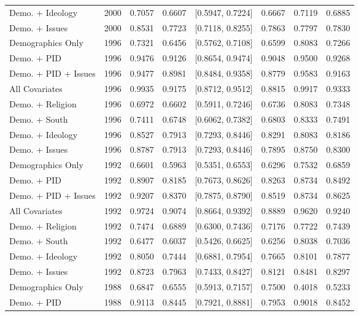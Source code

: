\begin{longtable}{lrrrlrrr}
  Demo. + Ideology & 2000 & 0.7057 & 0.6607 & [0.5947, 0.7224] & 0.6667 & 0.7119 & 0.6885 \\ 
  Demo. + Issues & 2000 & 0.8531 & 0.7723 & [0.7118, 0.8255] & 0.7863 & 0.7797 & 0.7830 \\ 
  Demographics Only & 1996 & 0.7321 & 0.6456 & [0.5762, 0.7108] & 0.6599 & 0.8083 & 0.7266 \\ 
  Demo. + PID & 1996 & 0.9476 & 0.9126 & [0.8654, 0.9474] & 0.9048 & 0.9500 & 0.9268 \\ 
  Demo. + PID + Issues & 1996 & 0.9477 & 0.8981 & [0.8484, 0.9358] & 0.8779 & 0.9583 & 0.9163 \\ 
  All Covariates & 1996 & 0.9935 & 0.9175 & [0.8712, 0.9512] & 0.8815 & 0.9917 & 0.9333 \\ 
  Demo. + Religion & 1996 & 0.6972 & 0.6602 & [0.5911, 0.7246] & 0.6736 & 0.8083 & 0.7348 \\ 
  Demo. + South & 1996 & 0.7411 & 0.6748 & [0.6062, 0.7382] & 0.6803 & 0.8333 & 0.7491 \\ 
  Demo. + Ideology & 1996 & 0.8527 & 0.7913 & [0.7293, 0.8446] & 0.8291 & 0.8083 & 0.8186 \\ 
  Demo. + Issues & 1996 & 0.8787 & 0.7913 & [0.7293, 0.8446] & 0.7895 & 0.8750 & 0.8300 \\ 
  Demographics Only & 1992 & 0.6601 & 0.5963 & [0.5351, 0.6553] & 0.6296 & 0.7532 & 0.6859 \\ 
  Demo. + PID & 1992 & 0.8907 & 0.8185 & [0.7673, 0.8626] & 0.8263 & 0.8734 & 0.8492 \\ 
  Demo. + PID + Issues & 1992 & 0.9207 & 0.8370 & [0.7875, 0.8790] & 0.8519 & 0.8734 & 0.8625 \\ 
  All Covariates & 1992 & 0.9724 & 0.9074 & [0.8664, 0.9392] & 0.8889 & 0.9620 & 0.9240 \\ 
  Demo. + Religion & 1992 & 0.7474 & 0.6889 & [0.6300, 0.7436] & 0.7176 & 0.7722 & 0.7439 \\ 
  Demo. + South & 1992 & 0.6477 & 0.6037 & [0.5426, 0.6625] & 0.6256 & 0.8038 & 0.7036 \\ 
  Demo. + Ideology & 1992 & 0.8050 & 0.7444 & [0.6881, 0.7954] & 0.7665 & 0.8101 & 0.7877 \\ 
  Demo. + Issues & 1992 & 0.8723 & 0.7963 & [0.7433, 0.8427] & 0.8121 & 0.8481 & 0.8297 \\ 
  Demographics Only & 1988 & 0.6847 & 0.6555 & [0.5913, 0.7157] & 0.7500 & 0.4018 & 0.5233 \\ 
  Demo. + PID & 1988 & 0.9113 & 0.8445 & [0.7921, 0.8881] & 0.7953 & 0.9018 & 0.8452 \\ 

\end{longtable}
